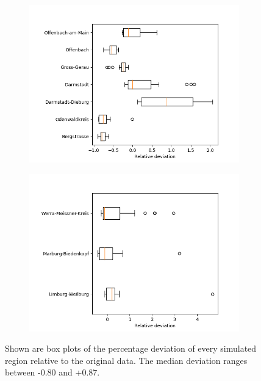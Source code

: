 \begin{figure}[h]
\begin{subfigure}[b]{0.4\textwidth}
		\includegraphics[width=\textwidth]{./figures/76d/deviation_box76_3.png}	
	\end{subfigure}
	\begin{subfigure}[b]{0.4\textwidth}
		\centering
		\includegraphics[width=\textwidth]{./figures/76d/deviation_box76_4.png}	
	\end{subfigure}
	\caption{Shown are box plots of the percentage deviation of every simulated region relative to the original data.
		The median deviation ranges between -0.80 and +0.87.}
	\label{fig:76_sim_box}
\end{figure}

